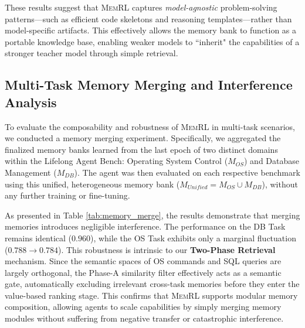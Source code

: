 \documentclass{article}
\theoremstyle{plain}
\theoremstyle{definition}
\theoremstyle{remark}
\begin{document}
These results suggest that \textsc{MemRL} captures \textit{model-agnostic} problem-solving patterns—such as efficient code skeletons and reasoning templates—rather than model-specific artifacts. This effectively allows the memory bank to function as a portable knowledge base, enabling weaker models to ``inherit" the capabilities of a stronger teacher model through simple retrieval.

\begin{table}[h]
\centering
\caption{\textbf{Cross-Model Transfer Results on HLE.} Performance of various agents using a frozen memory bank originally trained by \texttt{Gemini-3-pro}. $\Delta$ denotes the absolute improvement over the base model.}
\label{tab:transfer_models}
\end{table}


\subsection{Multi-Task Memory Merging and Interference Analysis}
To evaluate the composability and robustness of \textsc{MemRL} in multi-task scenarios, we conducted a memory merging experiment. Specifically, we aggregated the finalized memory banks learned from the last epoch of two distinct domains within the Lifelong Agent Bench: Operating System Control ($M_{OS}$) and Database Management ($M_{DB}$). The agent was then evaluated on each respective benchmark using this unified, heterogeneous memory bank ($M_{Unified} = M_{OS} \cup M_{DB}$), without any further training or fine-tuning.

As presented in Table \ref{tab:memory_merge}, the results demonstrate that merging memories introduces negligible interference. The performance on the DB Task remains identical ($0.960$), while the OS Task exhibits only a marginal fluctuation ($0.788 \rightarrow 0.784$). This robustness is intrinsic to our \textbf{Two-Phase Retrieval} mechanism. Since the semantic spaces of OS commands and SQL queries are largely orthogonal, the Phase-A similarity filter effectively acts as a semantic gate, automatically excluding irrelevant cross-task memories before they enter the value-based ranking stage. This confirms that \textsc{MemRL} supports modular memory composition, allowing agents to scale capabilities by simply merging memory modules without suffering from negative transfer or catastrophic interference.
\end{document}
